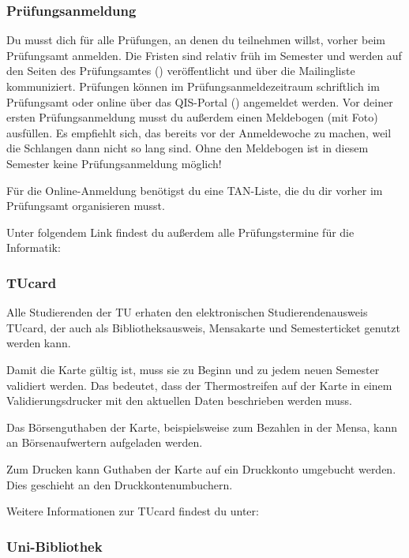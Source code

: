 \begin{multicols}{2}
\subsubsection{Prüfungsanmeldung}
	\label{todoanmeldung}

	Du musst dich für alle Prüfungen, an denen du teilnehmen willst, vorher beim Prüfungsamt anmelden.
Die Fristen sind relativ früh im Semester und werden auf den Seiten des Prüfungsamtes () veröffentlicht und über die Mailingliste kommuniziert.
Prüfungen können im Prüfungsanmeldezeitraum schriftlich im Prüfungsamt oder online über das QIS-Portal () angemeldet werden.
	Vor deiner ersten Prüfungsanmeldung musst du außerdem einen Meldebogen (mit Foto) ausfüllen.
Es empfiehlt sich, das bereits vor der Anmeldewoche zu machen, weil die Schlangen dann nicht so lang sind. Ohne den Meldebogen ist in diesem Semester keine Prüfungsanmeldung möglich!

	Für die Online-Anmeldung benötigst du eine TAN-Liste, die du dir vorher im Prüfungsamt organisieren musst.

	Unter folgendem Link findest du außerdem alle Prüfungstermine für die Informatik:

\subsubsection{TUcard}
	\label{tucard}
	
	Alle Studierenden der TU erhaten den elektronischen Studierendenausweis TUcard, der auch als Bibliotheksausweis, Mensakarte und Semesterticket genutzt werden kann.

	Damit die Karte gültig ist, muss sie zu Beginn und zu jedem neuen Semester validiert werden. Das bedeutet, dass der Thermostreifen auf der Karte in einem Validierungsdrucker mit den aktuellen Daten beschrieben werden muss.

	Das Börsenguthaben der Karte, beispielsweise zum Bezahlen in der Mensa, kann an Börsenaufwertern aufgeladen werden.

	Zum Drucken kann Guthaben der Karte auf ein Druckkonto umgebucht werden. Dies geschieht an den Druckkontenumbuchern.

	Weitere Informationen zur TUcard findest du unter: 

\subsubsection{Uni-Bibliothek}
	\label{todobib}


\end{multicols}

